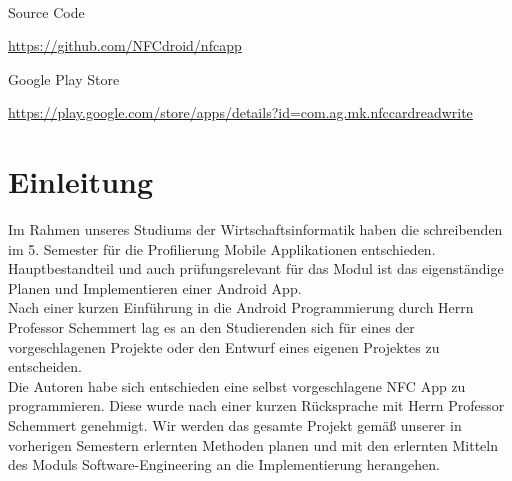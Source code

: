 \documentclass[a4paper,ngerman,12pt]{report}
\begin{document}
\begin{titlepage}
\begin{center}
		\\[2cm]
		\begin{minipage}{0.2\textwidth}
			\begin{flushleft}
				{\footnotesize Source Code}
			\end{flushleft}
		\end{minipage}
		\hfill
		\begin{minipage}{0.75\textwidth}
			\begin{flushleft}
				{\normalsize
				\url{https://github.com/NFCdroid/nfcapp}
				}
			\end{flushleft}
		\end{minipage}
		\begin{minipage}{0.2\textwidth}
			\begin{flushleft}
				{\footnotesize Google Play Store}
			\end{flushleft}
		\end{minipage}
		\hfill
		\begin{minipage}{0.75\textwidth}
			\begin{flushleft}
				{\normalsize
					\url{https://play.google.com/store/apps/details?id=com.ag.mk.nfccardreadwrite}
				}
			\end{flushleft}
		\end{minipage}
		\vfill
	\end{center}
\end{titlepage}

\begingroup
\pagestyle{empty}
\tableofcontents
\clearpage
\endgroup

\chapter{Einleitung}
 Im Rahmen unseres Studiums der Wirtschaftsinformatik haben die schreibenden im 5. Semester für die Profilierung Mobile Applikationen entschieden. Hauptbestandteil und auch prüfungsrelevant für das Modul ist das eigenständige Planen und Implementieren einer Android App. \\
 Nach einer kurzen Einführung in die Android Programmierung durch Herrn Professor Schemmert lag es an den Studierenden sich für eines der vorgeschlagenen Projekte oder den Entwurf eines eigenen Projektes zu entscheiden. \\
 Die Autoren habe sich entschieden eine selbst vorgeschlagene \ac{NFC} App zu programmieren. Diese wurde nach einer kurzen Rücksprache mit Herrn Professor Schemmert genehmigt. \newline
 Wir werden das gesamte Projekt gemäß unserer in vorherigen Semestern erlernten Methoden planen und mit den erlernten Mitteln des Moduls Software-Engineering an die Implementierung herangehen.
\end{document}
